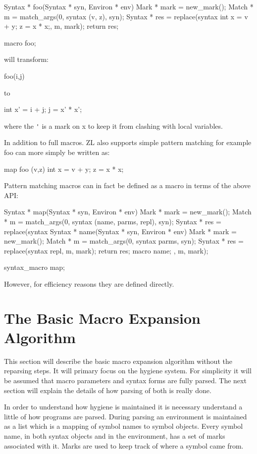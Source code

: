 \documentclass[12pt,english,letterpaper]{article}
\begin{document}
\begin{code}
Syntax * foo(Syntax * syn, Environ * env) {
  Mark * mark = new_mark();
  Match * m = match_args(0, syntax (v, z), syn);
  Syntax * res = replace(syntax {int x = v + y; z = x * x;}, m, mark);
  return res;
}
\end{code}
macro foo;

will transform:
\begin{code}
foo(i,j)
\end{code}
to
\begin{code}
int x' = i + j;
j = x' * x';
\end{code}
where the \verb/'/ is a mark on x to keep it from clashing with local variables.

In addition to full macros. ZL also supports simple pattern matching
for example foo can more simply be written as:

\begin{code}
map foo (v,z) {
  int x = v + y; 
  z = x * x;
}
\end{code}

Pattern matching macros can in fact be defined as a macro in terms of
the above API:

\begin{code}
Syntax * map(Syntax * syn, Environ * env) {
  Mark * mark = new_mark();
  Match * m = match_args(0, syntax (name, parms, repl), syn);
  Syntax * res = replace(syntax {
      Syntax * name(Syntax * syn, Environ * env) {
        Mark * mark = new_mark();
        Match * m = match_args(0, syntax parms, syn);
        Syntax * res = replace(syntax repl, m, mark);
        return res;
      }
      macro name;
    }, m, mark);
}

syntax_macro map;
\end{code}

However, for efficiency reasons they are defined directly.

\section{The Basic Macro Expansion Algorithm}

This section will describe the basic macro expansion algorithm without
the reparsing steps.  It will primary focus on the hygiene system.
For simplicity it will be assumed that macro parameters and syntax
forms are fully parsed.  The next section will explain the details of
how parsing of both is really done.  

In order to understand how hygiene is maintained it is necessary
understand a little of how programs are parsed.  During parsing an
environment is maintained as a list which is a mapping of symbol names
to symbol objects.  Every symbol name, in both syntax objects and in
the environment, has a set of marks associated with it.  Marks are
used to keep track of where a symbol came from.
\end{document}
